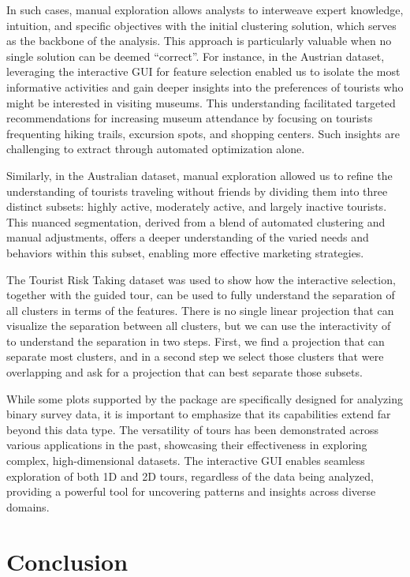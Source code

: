 \documentclass[article]{ajs}
\begin{document}
In such cases, manual exploration allows analysts to interweave expert knowledge, intuition, and specific objectives with the initial clustering solution, which serves as the backbone of the analysis. This approach is particularly valuable when no single solution can be deemed “correct''. For instance, in the Austrian dataset, leveraging the interactive GUI for feature selection enabled us to isolate the most informative activities and gain deeper insights into the preferences of tourists who might be interested in visiting museums. This understanding facilitated targeted recommendations for increasing museum attendance by focusing on tourists frequenting hiking trails, excursion spots, and shopping centers. Such insights are challenging to extract through automated optimization alone.

Similarly, in the Australian dataset, manual exploration allowed us to refine the understanding of tourists traveling without friends by dividing them into three distinct subsets: highly active, moderately active, and largely inactive tourists. This nuanced segmentation, derived from a blend of automated clustering and manual adjustments, offers a deeper understanding of the varied needs and behaviors within this subset, enabling more effective marketing strategies.

The Tourist Risk Taking dataset was used to show how the interactive selection, together with the guided tour, can be used to fully understand the separation of all clusters in terms of the features. There is no single linear projection that can visualize the separation between all clusters, but we can use the interactivity of  to understand the separation in two steps. First, we find a projection that can separate most clusters, and in a second step we select those clusters that were overlapping and ask for a projection that can best separate those subsets.

While some plots supported by the  package are specifically designed for analyzing binary survey data, it is important to emphasize that its capabilities extend far beyond this data type. The versatility of tours has been demonstrated across various applications in the past, showcasing their effectiveness in exploring complex, high-dimensional datasets. The interactive GUI enables seamless exploration of both 1D and 2D tours, regardless of the data being analyzed, providing a powerful tool for uncovering patterns and insights across diverse domains.


\section{Conclusion}~\label{conclusion}
\end{document}

